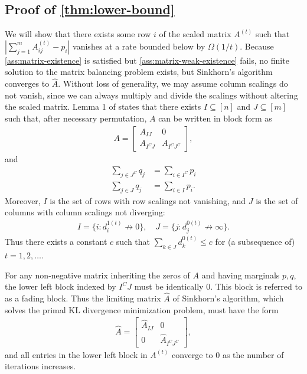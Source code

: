   \subsection{Proof of \cref{thm:lower-bound}}
  We will show that there exists some row $i$ of the scaled matrix $A^{(t)}$ such that $|\sum_{j=1}^m A^{(t)}_{ij}-p_i|$ vanishes at a rate bounded below by $\Omega(1/t)$. Because \cref{ass:matrix-existence} is satisfied but \cref{ass:matrix-weak-existence} fails, no finite solution to the
matrix balancing problem exists, but Sinkhorn's algorithm converges
to $\hat{A}$. Without loss of generality, we may assume column scalings
do not vanish, since we can always multiply and divide the scalings
without altering the scaled matrix. Lemma 1 of \citet{pukelsheim2014biproportional} states that
there exists $I\subseteq[n]$ and $J\subseteq[m]$ such that, after
necessary permutation, $A$ can be written in block form as 
\begin{align*}
A=\begin{bmatrix}A_{IJ} & 0\\
A_{I^{C}J} & A_{I^{C}J^{C}}
\end{bmatrix},
\end{align*}
 and 
\begin{align*}
\sum_{j\in J^{C}}q_{j} & =\sum_{i\in I^{C}}p_{i}\\
\sum_{j\in J}q_{j} & =\sum_{i\in I}p_{i}.
\end{align*}
Moreover, $I$ is the set of rows with row scalings not vanishing,
and $J$ is the set of columns with column scalings not diverging:
\begin{align*}
I=\{i:d_{i}^{1(t)}\not\rightarrow0\},\quad J=\{j:d_{j}^{0(t)}\not\rightarrow\infty\}.
\end{align*}
Thus there exists a constant $c$ such that $\sum_{k\in J}d_{k}^{0(t)}\leq c$
for (a subsequence of) $t=1,2,\dots$. 

For any non-negative matrix inheriting the zeros of $A$ and having
marginals $p,q$, the lower left block indexed by $I^{C}J$ must be
identically 0. This block is referred to as a fading block. Thus the
limiting matrix $\hat{A}$ of Sinkhorn's algorithm, which solves the
primal KL divergence minimization problem, must have the form 
\begin{align*}
\hat{A}=\begin{bmatrix}\hat{A}_{IJ} & 0\\
0 & \hat{A}_{I^{C}J^{C}}
\end{bmatrix},
\end{align*}
and all entries in the lower left block in $A^{(t)}$ converge to
$0$ as the number of iterations increases.

